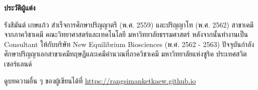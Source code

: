 

{
\thispagestyle{empty}

\begin{center}
    \LARGE\textbf{ประวัติผู้แต่ง}
\end{center}

รังสิมันต์ เกษแก้ว สำเร็จการศึกษาปริญญาตรี (พ.ศ. 2559) และปริญญาโท (พ.ศ. 2562) สาขาเคมี จากภาควิชาเคมี 
คณะวิทยาศาสตร์และเทคโนโลยี มหาวิทยาลัยธรรมศาสตร์ หลังจากนั้นทำงานเป็น Consultant ให้กับบริษัท New Equilibrium Biosciences 
(พ.ศ. 2562 - 2563) ปัจจุบันกำลังศึกษาปริญญาเอกสาขาเคมีทฤษฎีและเคมีคำนวณที่ภาควิชาเคมี มหาวิทยาลัยแห่งซูริค ประเทศสวิตเซอร์แลนด์

\noindent ดูบทความอื่น ๆ ของผู้เขียนได้ที่ \url{https://rangsimanketkaew.github.io}

\vfill
}
